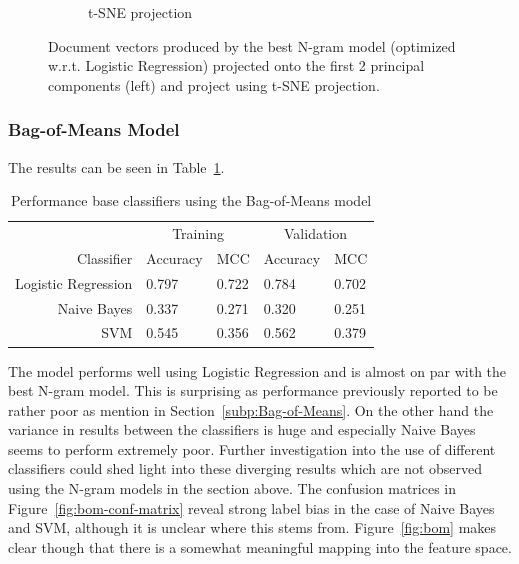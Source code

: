 \begin{figure}[h]
\begin{subfigure}[b]{0.48\textwidth}
      \caption{t-SNE projection}
\label{fig:ngram-tsne}
    \end{subfigure}
    \caption{Document vectors produced by the best N-gram model (optimized w.r.t. Logistic Regression) projected onto the first 2 principal components (left) and project using t-SNE projection.}
\label{fig:ngram}
\end{figure}

\subsubsection{Bag-of-Means Model}

 The results can be seen in Table~\ref{tab:Bag-Of-Means Results}.

\begin{table}[h]
  \begin{center}
  \begin{tabular}{ r | *2l | *2l }
    \toprule
     & \multicolumn{2}{c|}{Training} & \multicolumn{2}{|c}{Validation}\\
    Classifier & Accuracy & MCC & Accuracy & MCC \\
    \midrule
    Logistic Regression & 0.797 & 0.722 & 0.784 & 0.702 \\
    Naive Bayes         & 0.337 & 0.271 & 0.320 & 0.251 \\
    SVM                 & 0.545 & 0.356 & 0.562 & 0.379 \\
    \bottomrule
  \end{tabular}
  \caption{Performance base classifiers using the Bag-of-Means model}
\label{tab:Bag-Of-Means Results}
\end{center}
\end{table}

The model performs well using Logistic Regression and is almost on par with the best N-gram model. This is surprising as performance previously reported to be rather poor as mention in Section~\ref{subp:Bag-of-Means}. On the other hand the variance in results between the classifiers is huge and especially Naive Bayes seems to perform extremely poor. Further investigation into the use of different classifiers could shed light into these diverging results which are not observed using the N-gram models in the section above. The confusion matrices in Figure~\ref{fig:bom-conf-matrix} reveal strong label bias in the case of Naive Bayes and SVM, although it is unclear where this stems from. Figure~\ref{fig:bom} makes clear though that there is a somewhat meaningful mapping into the feature space. 

